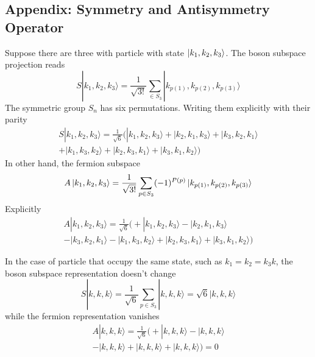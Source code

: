 \documentclass[../../../main.tex]{subfiles}
\begin{document}
\subsection{Appendix: Symmetry and  Antisymmetry Operator}
Suppose there are three with particle with state $\ket{k_1,k_2,k_3}$.
The boson subspace projection reads
\begin{equation*}
  S|k_1, k_2, k_3\rangle = \frac{1}{\sqrt{3!}} \sum_{\in S_3} |k_{p(1)}, k_{p(2)}, k_{p(3)}\rangle
\end{equation*}
The symmetric group $S_n$ has six permutations. 
Writing them explicitly with their parity
\begin{multline*}
    S|k_1, k_2, k_3\rangle = \frac{1}{\sqrt{6}} \big( |k_1, k_2, k_3\rangle + |k_2, k_1, k_3\rangle + |k_3, k_2, k_1\rangle \\
    + |k_1, k_3, k_2\rangle + |k_2, k_3, k_1\rangle + |k_3, k_1, k_2\rangle \big)
\end{multline*}
In other hand, the fermion subspace
\begin{equation*}
  A \ket{k_1, k_2, k_3} = \frac{1}{\sqrt{3!}} \sum_{p \in S_3} (-1)^{P(p)} \ket{k_{p(1)}, k_{p(2)}, k_{p(3)}}
\end{equation*}
Explicitly
\begin{multline*}
  A|k_1, k_2, k_3\rangle = \frac{1}{\sqrt{6}} \big( + |k_1, k_2, k_3\rangle - |k_2, k_1, k_3\rangle \\
  - |k_3, k_2, k_1\rangle - |k_1, k_3, k_2\rangle + |k_2, k_3, k_1\rangle + |k_3, k_1, k_2\rangle \big) 
\end{multline*}

In the case of particle that occupy the same state, such as $k_1=k_2=k_3k$, the boson subspace representation doesn't change
\begin{equation*}
  S|k, k, k\rangle = \frac{1}{\sqrt{6}} \sum_{p \in S_3} |k, k, k\rangle = \sqrt{6} |k, k, k\rangle
\end{equation*}
while the fermion representation vanishes
\begin{multline*}
  A|k, k, k\rangle = \frac{1}{\sqrt{6}} \big( + |k, k, k\rangle - |k, k, k\rangle \\
  - |k, k, k\rangle + |k, k, k\rangle + |k, k, k\rangle \big)=0
\end{multline*}
\end{document}
